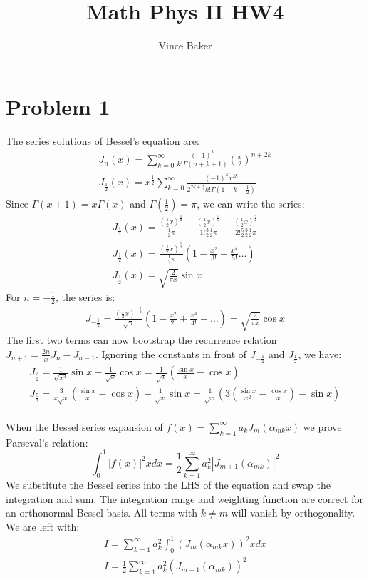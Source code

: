 \documentclass[a4paper,12pt]{article}
\title{Math Phys II HW4}
\author{Vince Baker}
\numberwithin{equation}{section}
\begin{document}
\maketitle

\section{Problem 1}
The series solutions of Bessel's equation are:
\begin{gather}
 J_n(x)=\sum_{k=0}^{\infty}\frac{(-1)^k}{k!\Gamma(n+k+1)}(\frac{x}{2})^{n+2k}\\
 J_{\frac{1}{2}}(x)=x^{\frac{1}{2}}\sum_{k=0}^{\infty}\frac{(-1)^kx^{2k}}{2^{2k+\frac{1}{2}}k!\Gamma(1+k+\frac{1}{2})}
\end{gather}
Since $\Gamma(x+1)=x\Gamma(x)$ and $\Gamma(\frac{1}{2})=\pi$, we can write the series:
\begin{gather}
 J_{\frac{1}{2}}(x)=\frac{(\frac{1}{2}x)^\frac{1}{2}}{\frac{1}{2}\pi}
 -\frac{(\frac{1}{2}x)^\frac{5}{2}}{1!\frac{3}{2}\frac{1}{2}\pi}
 +\frac{(\frac{1}{2}x)^\frac{9}{2}}{2!\frac{5}{2}\frac{3}{2}\frac{1}{2}\pi}\\
 J_{\frac{1}{2}}(x)=\frac{(\frac{1}{2}x)^\frac{1}{2}}{\frac{1}{2}\pi}(1-\frac{x^2}{3!}+\frac{x^4}{5!}\ldots)\\
 J_{\frac{1}{2}}(x)=\sqrt{\frac{2}{\pi x}}\sin x
\end{gather}
For $n=-\frac{1}{2}$, the series is:
\begin{gather}
 J_{-\frac{1}{2}}=\frac{(\frac{1}{2}x)^{-\frac{1}{2}}}{\sqrt{\pi}}(1-\frac{x^2}{2!}+\frac{x^4}{4!}-\ldots)=\sqrt{\frac{2}{\pi x}}\cos x
\end{gather}
The first two terms can now bootstrap the recurrence relation $J_{n+1}=\frac{2n}{x}J_n-J_{n-1}$.
Ignoring the constants in front of $J_{-\frac{1}{2}}$ and $J_{\frac{1}{2}}$, we have:
\begin{gather}
 J_{\frac{3}{2}}=\frac{1}{\sqrt{x^3}}\sin x- \frac{1}{\sqrt{x}}\cos x=\frac{1}{\sqrt{x}}(\frac{\sin x}{x}-\cos x)\\
 J_{\frac{5}{2}}=\frac{3}{x\sqrt{x}}(\frac{\sin x}{x}-\cos x)-\frac{1}{\sqrt{x}}\sin x= \frac{1}{\sqrt{x}}(3(\frac{\sin x}{x^2}-\frac{\cos x}{x} )-\sin x)
\end{gather}
\\
When the Bessel series expansion of $f(x)=\sum_{k=1}^{\infty}a_kJ_m(\alpha_{mk}x)$ we prove Parseval's relation:
\begin{equation}
 \int_0^1|f(x)|^2xdx=\frac{1}{2}\sum_{k=1}^{\infty}a_k^2|J_{m+1}(\alpha_{mk})|^2
\end{equation}
We substitute the Bessel series into the LHS of the equation and swap the integration and sum. 
The integration range and weighting function are correct for an orthonormal Bessel basis.
All terms with $k\neq m$ will vanish by orthogonality. We are left with:
\begin{gather}
 I=\sum_{k=1}^{\infty}a_k^2\int_0^1(J_m(\alpha_{mk}x))^2xdx\\
 I=\frac{1}{2}\sum_{k=1}^{\infty}a_k^2(J_{m+1}(\alpha_{mk}))^2
\end{gather}
\end{document}
